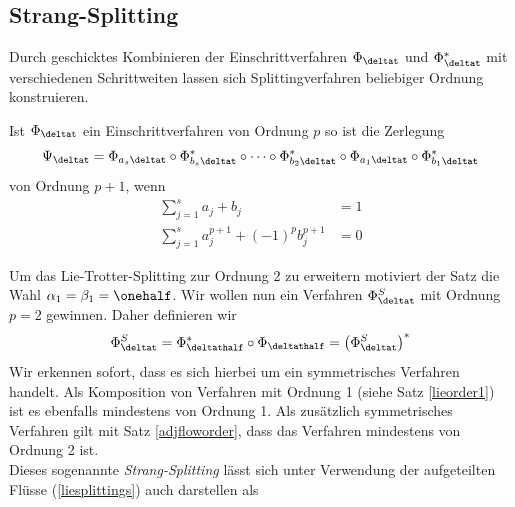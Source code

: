 \subsection{Strang-Splitting}
\label{secstrang}
Durch geschicktes Kombinieren der Einschrittverfahren $\Phi_{\deltat}$ und $\Phi_{\deltat}^*$ mit verschiedenen Schrittweiten lassen sich Splittingverfahren beliebiger Ordnung konstruieren.
\begin{maththeorem}
Ist $\Phi_{\deltat}$ ein Einschrittverfahren von Ordnung $p$ so ist die Zerlegung
\[\Psi_{\deltat}=\Phi_{a_s\deltat}\circ \Phi_{b_s\deltat}^*\circ\dots\circ\Phi_{b_2\deltat}^*\circ\Phi_{a_1\deltat}\circ\Phi_{b_1\deltat}^*\]
von Ordnung $p+1$, wenn 
\begin{align*}
\sum_{j=1}^sa_j+b_j&=1\\
\sum_{j=1}^sa_j^{p+1}+(-1)^pb_j^{p+1}&=0
\end{align*}
\end{maththeorem}
Um das Lie-Trotter-Splitting zur Ordnung 2 zu erweitern motiviert der Satz die Wahl $\alpha_1=\beta_1=\onehalf$. Wir wollen nun ein Verfahren $\Phi_{\deltat}^S$ mit Ordnung $p=2$ gewinnen. Daher definieren wir
\[\Phi_{\deltat}^S=\Phi_{\deltathalf}^*\circ\Phi_{\deltathalf}=\left(\Phi_{\deltat}^S\right)^*\]
Wir erkennen sofort, dass es sich hierbei um ein symmetrisches Verfahren handelt. Als Komposition von Verfahren mit Ordnung 1 (siehe Satz \ref{lieorder1}) ist es ebenfalls mindestens von Ordnung 1. Als zusätzlich symmetrisches Verfahren gilt mit Satz \ref{adjfloworder}, dass das Verfahren mindestens von Ordnung 2 ist.\\
Dieses sogenannte \emph{Strang-Splitting} lässt sich unter Verwendung der aufgeteilten Flüsse (\ref{liesplittings}) auch darstellen als 

